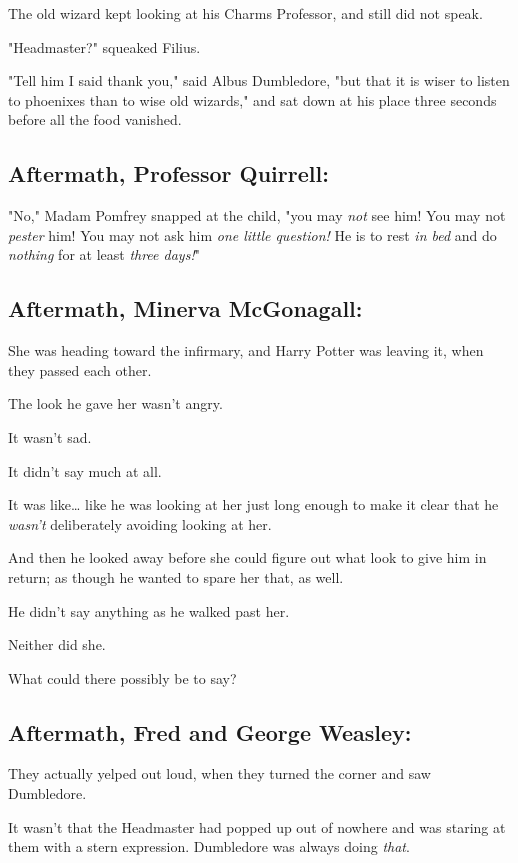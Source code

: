 The old wizard kept looking at his Charms Professor, and still did not speak.

"Headmaster?" squeaked Filius.

"Tell him I said thank you," said Albus Dumbledore, "but that it is wiser to 
listen to phoenixes than to wise old wizards," and sat down at his place three 
seconds before all the food vanished.
\sbreak
\vspace{-2\baselineskip}
\subsection{Aftermath, Professor Quirrell:}

"No," Madam Pomfrey snapped at the child, "you may \emph{not} see him! You may 
not \emph{pester} him! You may not ask him \emph{one little question!} He is to 
rest \emph{in bed} and do \emph{nothing} for at least \emph{three days!}"
\sbreak
\vspace{-2\baselineskip}
\subsection{Aftermath, Minerva McGonagall:}

She was heading toward the infirmary, and Harry Potter was leaving it, when 
they passed each other.

The look he gave her wasn't angry.

It wasn't sad.

It didn't say much at all.

It was like{\ldots} like he was looking at her just long enough to make it 
clear that he \emph{wasn't} deliberately avoiding looking at her.

And then he looked away before she could figure out what look to give him in 
return; as though he wanted to spare her that, as well.

He didn't say anything as he walked past her.

Neither did she.

What could there possibly be to say?
\sbreak
\vspace{-2\baselineskip}
\subsection{Aftermath, Fred and George Weasley:}

They actually yelped out loud, when they turned the corner and saw Dumbledore.

It wasn't that the Headmaster had popped up out of nowhere and was staring at 
them with a stern expression. Dumbledore was always doing \emph{that}.

